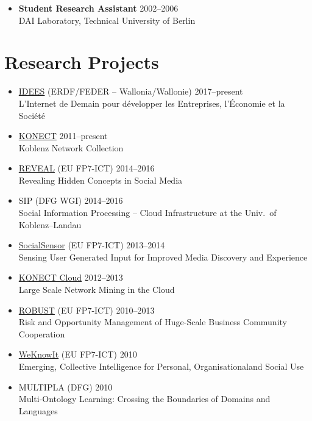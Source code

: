 \documentclass[line,mm]{res}
\newcounter{x}
\newcounter{y}
\begin{document}
\begin{resume}
\begin{itemize}
\item[]
\textbf{Student Research Assistant} \hfill 2002--2006 \\
DAI Laboratory, Technical University of Berlin 

\end{itemize}

\section{Research Projects}
\begin{itemize}
\item 
  \href{http://nouvelles.unamur.be/upnews.2015-10-01.8995593781}{IDEES} (ERDF/FEDER -- Wallonia/Wallonie) \hfill 2017--present \\
  L'Internet de Demain pour développer les Entreprises, l'Économie et la Société 
\item \href{http://konect.uni-koblenz.de/}{KONECT} \hfill 2011--present \\
  Koblenz Network Collection
\item \href{http://revealproject.eu/}{REVEAL} (EU FP7-ICT) \hfill 2014--2016 \\
  Revealing Hidden Concepts in Social Media
\item SIP (DFG WGI) \hfill 2014--2016 \\
  Social Information Processing -- Cloud Infrastructure at the Univ.\ of Koblenz--Landau
\item \href{http://www.socialsensor.eu/}{SocialSensor} (EU FP7-ICT) \hfill 2013--2014 \\
  Sensing User Generated Input for Improved Media Discovery and Experience
\item \href{https://books.google.be/books?id=06fDCQAAQBAJ&pg=PA107}{KONECT Cloud} \hfill 2012--2013 \\
  Large Scale Network Mining in the Cloud
\item \href{http://www.robust-project.eu/}{ROBUST} (EU FP7-ICT) \hfill 2010--2013 \\
  Risk and Opportunity Management of Huge-Scale Business Community Cooperation 
\item \href{http://www.weknowit.eu/}{WeKnowIt} (EU FP7-ICT) \hfill 2010 \\
   Emerging, Collective Intelligence for Personal, Organisationaland Social Use
\item MULTIPLA (DFG) \hfill 2010 \\
  Multi-Ontology Learning:  Crossing the Boundaries of Domains and Languages

\end{itemize}
\end{resume}
\end{document}
